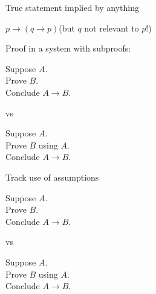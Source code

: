 \documentclass{beamer}
\begin{document}
\begin{frame}{True statement implied by anything}

$p\to (q\to p)$\hfill (but $q$ not relevant to $p$!)

\vfill

Proof in a system with subproofs:

\addvspace{\baselineskip}
\begin{minipage}{.45\textwidth}
\end{minipage}
\hfill
\begin{minipage}{.35\textwidth}
Suppose $A$.\\
Prove $B$.\\
Conclude $A\to B$.

\qquad vs

Suppose $A$.\\
Prove $B$ using $A$.\\
Conclude $A\to B$.
\end{minipage}
\end{frame}

\begin{frame}{Track use of assumptions}

\begin{minipage}{.45\textwidth}
\end{minipage}
\hfill
\begin{minipage}{.35\textwidth}
Suppose $A$.\\
Prove $B$.\\
Conclude $A\to B$.

\qquad vs

Suppose $A$.\\
Prove $B$ using $A$.\\
Conclude $A\to B$.
\end{minipage}
\end{frame}
\end{document}

